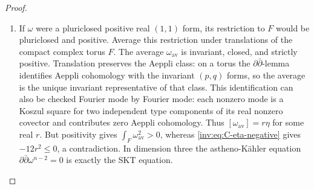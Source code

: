 \begin{proof}
\begin{enumerate}[label=\arabic*.,leftmargin=*]
\item If $\omega$ were a pluriclosed positive real $(1,1)$ form, its
restriction to $F$ would be pluriclosed and positive.  Average this
restriction under translations of the compact complex torus $F$.
The average $\omega_{\mathrm{av}}$ is invariant, closed, and
strictly positive.  Translation preserves the Aeppli class: on a
torus the $\partial\bar\partial$-lemma identifies Aeppli
cohomology with the invariant $(p,q)$ forms, so the average is the
unique invariant representative of that class.  This identification
can also be checked Fourier mode by Fourier mode: each nonzero mode
is a Koszul square for two independent type components of its real
nonzero covector and contributes zero Aeppli cohomology.  Thus
$[\omega_{\mathrm{av}}]=r\eta$ for some real $r$.
But positivity gives $\int_F\omega_{\mathrm{av}}^2>0$, whereas
\eqref{inv:eq:C-eta-negative} gives $-12r^2\le0$, a contradiction.
In dimension three the astheno-K\"ahler equation
$\partial\bar\partial\omega^{n-2}=0$ is exactly the SKT equation.
\end{enumerate}
\end{proof}




